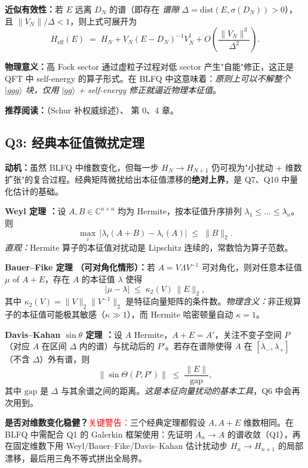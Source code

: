 \documentclass{article}
\begin{document}
\textbf{近似有效性：}若 $E$ 远离 $D_{N}$ 的谱（即存在 \emph{谱隙} $\Delta=\mathrm{dist}(E,\sigma(D_{N}))>0$），且 $\|V_{N}\|/\Delta<1$，则上式可展开为
\[
H_{\mathrm{eff}}(E) \;=\; H_{N} + V_{N}(E-D_{N})^{-1}V_{N}^{\dagger} + O\!\left(\frac{\|V_{N}\|^{3}}{\Delta^{2}}\right).
\]

\textbf{物理意义：}高 Fock sector 通过虚粒子过程对低 sector 产生"自能"修正，这正是 QFT 中 self-energy 的算子形式。在 BLFQ 中这意味着：\emph{原则上可以不解整个 $|ggg\rangle$ 块，仅用 $|gg\rangle$ + self-energy 修正就逼近物理本征值}。

\textbf{推荐阅读：}\cite{Zhang_2005_Schur}（Schur 补权威综述）、\cite{Horn_Johnson_2013} 第 0、4 章。

\subsection{Q3: 经典本征值微扰定理}

\textbf{动机：}虽然 BLFQ 中维数变化，但每一步 $H_{N}\to H_{N+1}$ 仍可视为"小扰动 + 维数扩张"的复合过程。经典矩阵微扰给出本征值漂移的\textbf{绝对上界}，是 Q7、Q10 中量化估计的基础。

\textbf{Weyl 定理 \cite{Weyl_1912}：}设 $A,B\in\mathbb{C}^{n\times n}$ 均为 Hermite，按本征值升序排列 $\lambda_{1}\le\dots\le\lambda_{n}$。则
\[
\max_{i}\,|\lambda_{i}(A+B)-\lambda_{i}(A)| \;\le\; \|B\|_{2}.
\]
\emph{直观：}Hermite 算子的本征值对扰动是 Lipschitz 连续的，常数恰为算子范数。

\textbf{Bauer--Fike 定理 \cite{Bauer_Fike_1960}（可对角化情形）：}若 $A=V\Lambda V^{-1}$ 可对角化，则对任意本征值 $\mu$ of $A+E$，存在 $A$ 的本征值 $\lambda$ 使得
\[
|\mu-\lambda|\;\le\;\kappa_{2}(V)\,\|E\|_{2},
\]
其中 $\kappa_{2}(V)=\|V\|_{2}\|V^{-1}\|_{2}$ 是特征向量矩阵的条件数。\emph{物理含义：}非正规算子的本征值可能极其敏感（$\kappa\gg 1$），而 Hermite 哈密顿量自动 $\kappa=1$。

\textbf{Davis--Kahan $\sin\theta$ 定理 \cite{Davis_Kahan_1970}：}设 $A$ Hermite，$A+E=A'$，关注不变子空间 $P$（对应 $A$ 在区间 $\Delta$ 内的谱）与扰动后的 $P'$。若存在谱隙使得 $A$ 在 $[\lambda_{-},\lambda_{+}]$（不含 $\Delta$）外有谱，则
\[
\|\sin\Theta(P,P')\| \;\le\; \frac{\|E\|}{\mathrm{gap}},
\]
其中 $\mathrm{gap}$ 是 $\Delta$ 与其余谱之间的距离。\emph{这是本征向量扰动的基本工具}，Q6 中会再次用到。

\textbf{是否对维数变化稳健？}\textcolor{red}{关键警告：}三个经典定理都假设 $A,A+E$ 维数相同。在 BLFQ 中需配合 Q1 的 Galerkin 框架使用：先证明 $A_{n}\to A$ 的谱收敛（Q1），再在固定维数下用 Weyl/Bauer--Fike/Davis--Kahan 估计扰动步 $H_{n}\to H_{n+1}$ 的局部漂移，最后用三角不等式拼出全局界。
\end{document}
